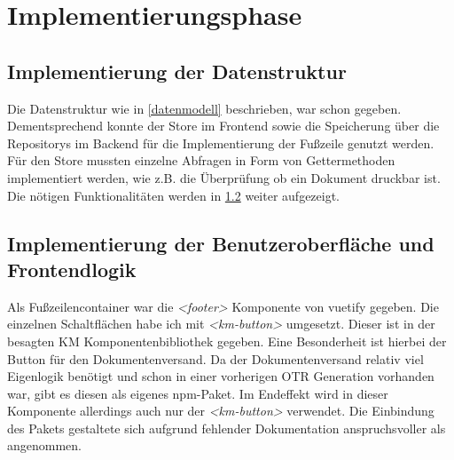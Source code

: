 \section{Implementierungsphase}
\label{implementierungsphase}

\subsection{Implementierung der Datenstruktur}
\label{datenstruktur}
Die Datenstruktur wie in \ref{datenmodell} beschrieben, war schon gegeben. Dementsprechend konnte der Store im Frontend sowie die Speicherung über die Repositorys im Backend für die Implementierung der Fußzeile genutzt werden.\\
Für den Store mussten einzelne Abfragen in Form von Gettermethoden implementiert werden, wie z.B. die Überprüfung ob ein Dokument druckbar ist. Die nötigen Funktionalitäten werden in \ref{oberflacheimplemetieren} weiter aufgezeigt.
\subsection{Implementierung der Benutzeroberfläche und Frontendlogik}
\label{oberflacheimplemetieren}
Als Fußzeilencontainer war die \textit{<footer>} Komponente von \gls{vuetify} gegeben. Die einzelnen Schaltflächen habe ich mit \textit{<km-button>} umgesetzt. Dieser ist in der besagten \ac{KM} Komponentenbibliothek gegeben. Eine Besonderheit ist hierbei der Button für den Dokumentenversand. Da der Dokumentenversand relativ viel Eigenlogik benötigt und schon in einer vorherigen \ac{OTR} Generation vorhanden war, gibt es diesen als eigenes \gls{npm}-Paket. Im Endeffekt wird in dieser Komponente allerdings auch nur der \textit{<km-button>} verwendet. Die Einbindung des Pakets gestaltete sich aufgrund fehlender Dokumentation anspruchsvoller als angenommen.\\

